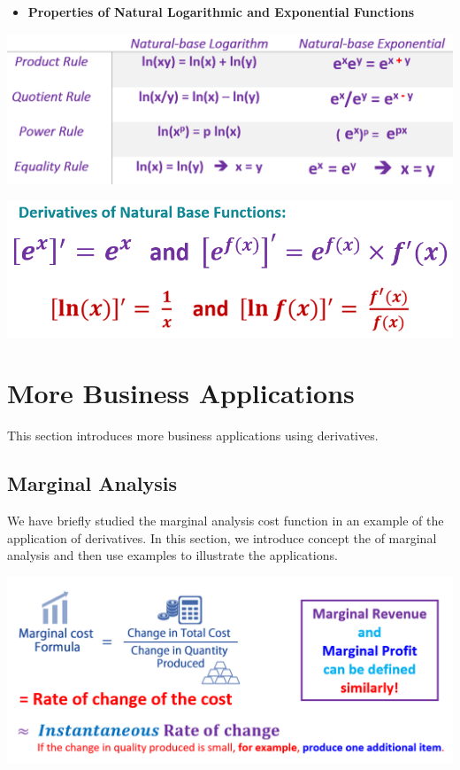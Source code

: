 \documentclass[
]{book}
\providecommand{\tightlist}{%
  \setlength{\itemsep}{0pt}\setlength{\parskip}{0pt}}
\begin{document}
\hfill\break

\begin{itemize}
\tightlist
\item
  \textbf{Properties of Natural Logarithmic and Exponential Functions}
\end{itemize}

\begin{center}\includegraphics[width=0.7\linewidth]{img10/w10-NaturalExpLogProperties} \end{center}

\begin{center}\includegraphics[width=0.45\linewidth]{img10/w10-DerivativesExpLn} \end{center}

\hfill\break

\hypertarget{more-business-applications}{%
\section{More Business Applications}\label{more-business-applications}}

This section introduces more business applications using derivatives.

\hypertarget{marginal-analysis}{%
\subsection{Marginal Analysis}\label{marginal-analysis}}

We have briefly studied the marginal analysis cost function in an example of the application of derivatives. In this section, we introduce concept the of marginal analysis and then use examples to illustrate the applications.

\begin{center}\includegraphics[width=0.7\linewidth]{img10/w10-MarginalCost} \end{center}
\end{document}
